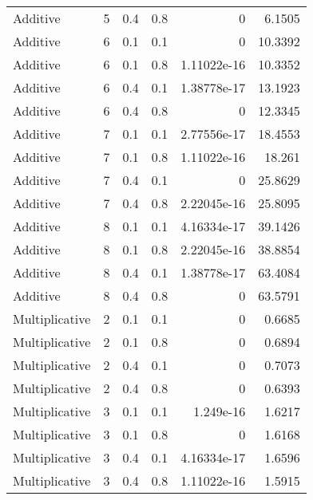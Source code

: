 \documentclass{article}
\begin{document}
\begin{figure}[H]
\begin{tabular}{lrrrrr}
 Additive       &       5 &   0.4 &            0.8 & 0           &            6.1505 \\
 Additive       &       6 &   0.1 &            0.1 & 0           &           10.3392 \\
 Additive       &       6 &   0.1 &            0.8 & 1.11022e-16 &           10.3352 \\
 Additive       &       6 &   0.4 &            0.1 & 1.38778e-17 &           13.1923 \\
 Additive       &       6 &   0.4 &            0.8 & 0           &           12.3345 \\
 Additive       &       7 &   0.1 &            0.1 & 2.77556e-17 &           18.4553 \\
 Additive       &       7 &   0.1 &            0.8 & 1.11022e-16 &           18.261  \\
 Additive       &       7 &   0.4 &            0.1 & 0           &           25.8629 \\
 Additive       &       7 &   0.4 &            0.8 & 2.22045e-16 &           25.8095 \\
 Additive       &       8 &   0.1 &            0.1 & 4.16334e-17 &           39.1426 \\
 Additive       &       8 &   0.1 &            0.8 & 2.22045e-16 &           38.8854 \\
 Additive       &       8 &   0.4 &            0.1 & 1.38778e-17 &           63.4084 \\
 Additive       &       8 &   0.4 &            0.8 & 0           &           63.5791 \\
 Multiplicative &       2 &   0.1 &            0.1 & 0           &            0.6685 \\
 Multiplicative &       2 &   0.1 &            0.8 & 0           &            0.6894 \\
 Multiplicative &       2 &   0.4 &            0.1 & 0           &            0.7073 \\
 Multiplicative &       2 &   0.4 &            0.8 & 0           &            0.6393 \\
 Multiplicative &       3 &   0.1 &            0.1 & 1.249e-16   &            1.6217 \\
 Multiplicative &       3 &   0.1 &            0.8 & 0           &            1.6168 \\
 Multiplicative &       3 &   0.4 &            0.1 & 4.16334e-17 &            1.6596 \\
 Multiplicative &       3 &   0.4 &            0.8 & 1.11022e-16 &            1.5915 \\

\end{tabular}
\end{figure}
\end{document}
